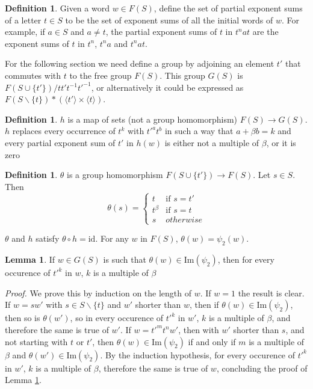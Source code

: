 \documentclass[12pt]{article} %
\theoremstyle{definition}
\theoremstyle{definition}
\theoremstyle{definition}
\newtheorem{lemma}[thm]{Lemma}
\theoremstyle{definition}
\newtheorem{defn}[thm]{Definition}
\begin{document}
\begin{defn}
  Given a word $w \in F(S)$, define the set of partial exponent sums of a letter $t \in S$ to
  be the set of exponent sums of all the initial words of $w$. For example, if $a \in S$ and
  $a \ne t$, the partial
  exponent sums of $t$ in $t^n a t$ are the exponent sums of $t$ in
  $t^n$, $t^na$ and $t^nat$.
\end{defn}

For the following section we need define a group by adjoining an element $t'$ that commutes
with $t$ to the free group $F(S)$. This group $G(S)$ is $F(S \cup \{t'\}) / tt't^{-1}t'^{-1}$,
or alternatively it could be expressed as $F(S \backslash \{t\}) \ast
(\langle t' \rangle \times \langle t \rangle)$.

\begin{defn}
  $h$ is a map of sets (not a group homomorphism) $F(S) \to G(S)$.
  $h$ replaces every occurrence of $t^k$ with $t'^at^b$ in such a way that $a + \beta b = k$
  and every partial exponent sum of $t'$ in $h(w)$ is either not a multiple of $\beta$,
  or it is zero
\end{defn}

\begin{defn}
  $\theta$ is a group homomorphism $F(S \cup \{t'\}) \to F(S)$. Let $s \in S$. Then
  \begin{equation}
    \theta(s) = \begin{cases}
      t & \text{if } s = t' \\
      t^\beta & \text{if } s = t \\
      s & otherwise
    \end{cases}
  \end{equation}
\end{defn}

$\theta$ and $h$ satisfy $\theta \circ h = \text{id}$. For any $w$ in $F(S)$,
$\theta(w) = \psi_2(w)$.

\begin{lemma}\label{thetatt'}
  If $w \in G(S)$ is such that $\theta(w) \in \text{Im}(\psi_2)$,
  then for every occurence of $t'^k$ in $w$, $k$ is a multiple of $\beta$
\end{lemma}

\textit{Proof.} We prove this by induction on the length of $w$. If $w=1$ the result is clear.
If $w = sw'$ with $s \in S \backslash \{t\}$ and $w'$ shorter than $w$,
then if $\theta(w) \in \text{Im}(\psi_2)$, then so is $\theta(w')$, so in every occurence
of $t'^k$ in $w'$, $k$ is a multiple of $\beta$, and therefore the same is true of $w'$.
If $w = t'^m t ^ n w'$, then with $w'$ shorter than $s$, and not starting with $t$ or $t'$,
then $\theta(w) \in \text{Im}(\psi_2)$ if and only if $m$ is a multiple of $\beta$ and
$\theta(w') \in \text{Im}(\psi_2)$. By the induction hypothesis, for every occurence of $t'^k$
in $w'$, $k$ is a multiple of $\beta$, therefore the same is true of $w$, concluding the proof
of Lemma \ref{thetatt'}.
\end{document}
